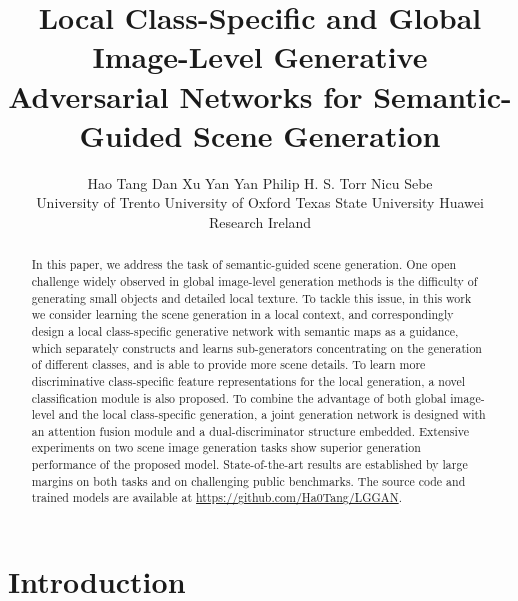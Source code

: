 \documentclass[10pt,twocolumn,letterpaper]{article}
\begin{document}
\title{Local Class-Specific and Global Image-Level Generative Adversarial Networks for Semantic-Guided Scene Generation}


\author{Hao Tang \quad Dan Xu \quad Yan Yan \quad Philip H. S. Torr \quad Nicu Sebe \\
University of Trento \quad University of Oxford \quad Texas State University \quad Huawei Research Ireland
}

\maketitle


\begin{abstract}
	




In this paper, we address the task of semantic-guided scene generation. One open challenge widely observed in global image-level generation methods is the difficulty of generating small objects and detailed local texture. To tackle this issue, in this work we consider learning the scene generation in a local context, and correspondingly design a local class-specific generative network with semantic maps as a guidance, which separately constructs and learns sub-generators concentrating on the generation of different classes, and is able to provide more scene details. To learn more discriminative class-specific feature representations for the local generation, a novel classification module is also proposed. To combine the advantage of both global image-level and the local class-specific generation, a joint generation network is designed with an attention fusion module and a dual-discriminator structure embedded.
Extensive experiments on two scene image generation tasks show superior generation performance of the proposed model. State-of-the-art results are established by large margins on both tasks and on challenging public benchmarks. The source code and trained models are available at
\url{https://github.com/Ha0Tang/LGGAN}.









\end{abstract}

 \section{Introduction}
\end{document}
